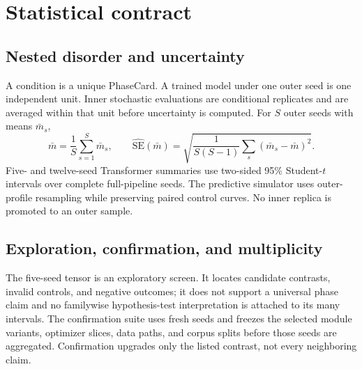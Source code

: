 \section{Statistical contract}
\label{sec:statistics}

\subsection{Nested disorder and uncertainty}

A condition is a unique PhaseCard. A trained model under one outer seed is one
independent unit. Inner stochastic evaluations are conditional replicates and
are averaged within that unit before uncertainty is computed. For $S$ outer
seeds with means $\bar m_s$,
\begin{equation}
  \bar m=\frac{1}{S}\sum_{s=1}^{S}\bar m_s,
  \qquad
  \widehat{\mathrm{SE}}(\bar m)=
  \sqrt{\frac{1}{S(S-1)}\sum_s(\bar m_s-\bar m)^2}.
\end{equation}
Five- and twelve-seed Transformer summaries use two-sided 95\% Student-$t$
intervals over complete full-pipeline seeds. The predictive simulator uses
outer-profile resampling while preserving paired control curves. No inner
replica is promoted to an outer sample.

\subsection{Exploration, confirmation, and multiplicity}

The five-seed tensor is an exploratory screen. It locates candidate contrasts,
invalid controls, and negative outcomes; it does not support a universal phase
claim and no familywise hypothesis-test interpretation is attached to its many
intervals. The confirmation suite uses fresh seeds and freezes the selected
module variants, optimizer slices, data paths, and corpus splits before those
seeds are aggregated. Confirmation upgrades only the listed contrast, not every
neighboring claim.

